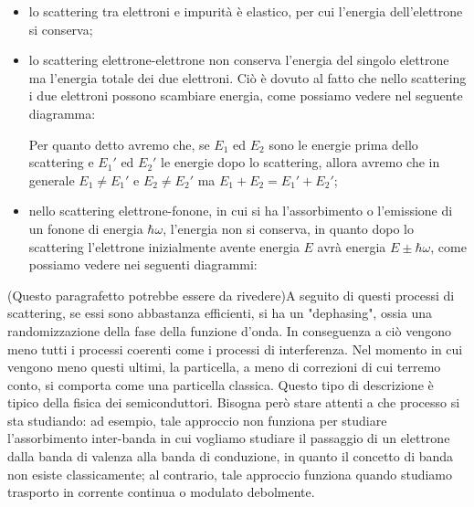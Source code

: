 \begin{itemize}[leftmargin=0.5cm]
    \item lo scattering tra elettroni e impurità è elastico, per cui l'energia dell'elettrone si conserva;
    \item lo scattering elettrone-elettrone non conserva l'energia del singolo elettrone ma l'energia totale dei due elettroni. Ciò è dovuto al fatto che nello scattering i due elettroni possono scambiare energia, come possiamo vedere nel seguente diagramma:
    \begin{figure}[H]
        \centering
    \end{figure}
    Per quanto detto avremo che, se $E_1$ ed $E_2$ sono le energie prima dello scattering e $E_1'$ ed $E_2'$ le energie dopo lo scattering, allora avremo che in generale $E_1 \neq E_1'$ e $E_2 \neq E_2'$ ma $E_1 + E_2 = E_1' + E_2'$;
    \item nello scattering elettrone-fonone, in cui si ha l'assorbimento o l'emissione di un fonone di energia $\hbar \omega$, l'energia non si conserva, in quanto dopo lo scattering l'elettrone inizialmente avente energia $E$ avrà energia $E \pm \hbar \omega$, come possiamo vedere nei seguenti diagrammi:
    \begin{figure}[H]
        \centering
    \end{figure}
\end{itemize}
(Questo paragrafetto potrebbe essere da rivedere)A seguito di questi processi di scattering, se essi sono abbastanza efficienti, si ha un "dephasing", ossia una randomizzazione della fase della funzione d'onda. In conseguenza a ciò vengono meno tutti i processi coerenti come i processi di interferenza. Nel momento in cui vengono meno questi ultimi, la particella, a meno di correzioni di cui terremo conto, si comporta come una particella classica. Questo tipo di descrizione è tipico della fisica dei semiconduttori. Bisogna però stare attenti a che processo si sta studiando: ad esempio, tale approccio non funziona per studiare l'assorbimento inter-banda in cui vogliamo studiare il passaggio di un elettrone dalla banda di valenza alla banda di conduzione, in quanto il concetto di banda non esiste classicamente; al contrario, tale approccio funziona quando studiamo trasporto in corrente continua o modulato debolmente.\\
